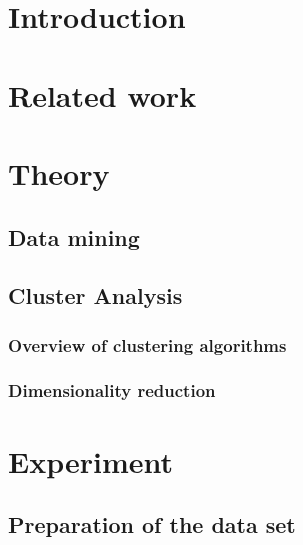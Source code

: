 \section{Introduction}
\label{section:Introduction}




\section{Related work}
\label{section:RelatedWork}




\section{Theory}
\label{section:Theory}


  \subsection{Data mining}
  \label{section:TheoryDataMining}
  

  \subsection{Cluster Analysis}
  \label{section:TheoryClusterAnalysis}
  

    \subsubsection{Overview of clustering algorithms}
    \label{section:TheoryOverviewClusteringAlgorithms}
    

    \subsubsection{Dimensionality reduction}
    \label{section:TheoryDimensionalityReduction}
    



\section{Experiment}
\label{section:Experiment}


  \subsection{Preparation of the data set}
  \label{section:ExperimentPreparationDataSet}
  

